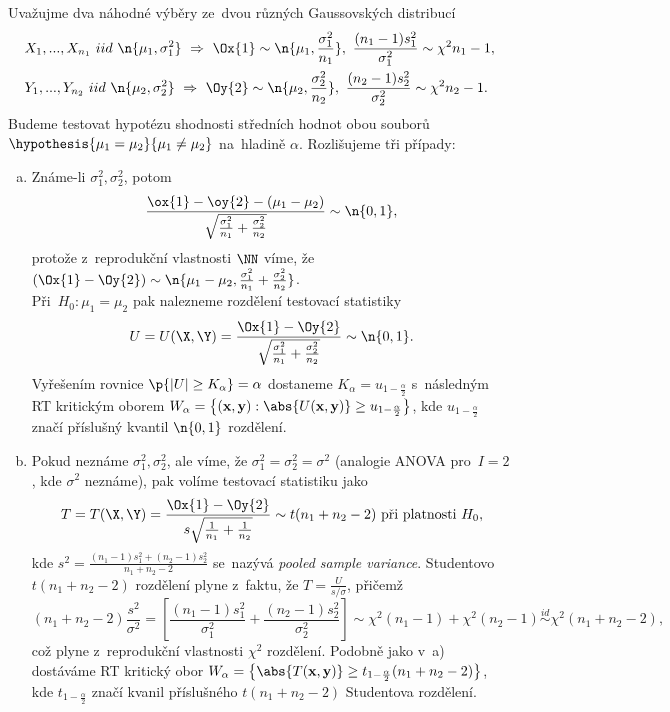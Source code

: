 \begin{example}\label{dvouvyber} Uvažujme dva náhodné výběry ze~dvou různých Gaussovských distribucí
\[
\begin{split}
&X_1,...,X_{n_1}~iid~\n{\mu_1,\sigma_1^2}~\Rightarrow~\Ox{1}\sim\n{\mu_1,\frac{\sigma_1^2}{n_1}},~\frac{(n_1-1)s_1^2}{\sigma_1^2}\sim\chi^2{n_1-1},\\
&Y_1,...,Y_{n_2}~iid~\n{\mu_2,\sigma_2^2}~\Rightarrow~\Oy{2}\sim\n{\mu_2,\frac{\sigma_2^2}{n_2}},~\frac{(n_2-1)s_2^2}{\sigma_2^2}\sim\chi^2{n_2-1}.
\end{split}
\]
Budeme testovat hypotézu shodnosti středních hodnot obou souborů $\hypothesis{\mu_1=\mu_2}{\mu_1\neq\mu_2}$ na~hladině $\alpha$. Rozlišujeme tři případy:
\begin{enumerate}[a)]
	\item Známe-li $\sigma_1^2,\sigma_2^2$, potom $$\frac{\ox{1}-\oy{2}-(\mu_1-\mu_2)}{\sqrt{\frac{\sigma_1^2}{n_1}+\frac{\sigma_2^2}{n_2}}}\sim\n{0,1},$$ protože z~reprodukční vlastnosti $\NN$ víme, že $(\Ox{1}-\Oy{2})\sim\n{\mu_1-\mu_2,\frac{\sigma_1^2}{n_1}+\frac{\sigma_2^2}{n_2}}$.\\ Při~$H_0:\mu_1=\mu_2$ pak nalezneme rozdělení testovací statistiky $$U=U(\X,\Y)=\frac{\Ox{1}-\Oy{2}}{\sqrt{\frac{\sigma_1^2}{n_1}+\frac{\sigma_2^2}{n_2}}}\sim\n{0,1}.$$ Vyřešením rovnice $\p{|U|\geq K_\alpha}=\alpha$ dostaneme $K_\alpha=u_{1-\frac{\alpha}{2}}$ s~následným RT kritickým oborem $W_\alpha=\left\{ (\textbf{x},\textbf{y}): \abs{U(\textbf{x},\textbf{y})}\geq u_{1-\frac{\alpha}{2}} \right\}$, kde $u_{1-\frac{\alpha}{2}}$ značí příslušný kvantil $\n{0,1}$ rozdělení. 
	\item Pokud neznáme $\sigma_1^2,\sigma_2^2$, ale víme, že $\sigma_1^2=\sigma_2^2=\sigma^2$ (analogie ANOVA pro~$I=2$, kde $\sigma^2$ neznáme), pak volíme testovací statistiku jako
	$$ T=T(\X,\Y)=\frac{\Ox{1}-\Oy{2}}{s\sqrt{\frac{1}{n_1}+\frac{1}{n_2}}}\sim t(n_1+n_2-2)\text{ při~platnosti }H_0, $$ kde $s^2=\frac{(n_1-1)s_1^2+(n_2-1)s_2^2}{n_1+n_2-2}$ se~nazývá \textit{pooled sample variance}.
	Studentovo $t(n_1+n_2-2)$ rozdělení plyne z~faktu, že $T=\frac{U}{s/\sigma}$, přičemž  $$(n_1+n_2-2)\frac{s^2}{\sigma^2}=\left[ \frac{(n_1-1)s_1^2}{\sigma_1^2}+\frac{(n_2-1)s_2^2}{\sigma_2^2} \right]\sim \chi^2(n_1-1)+\chi^2(n_2-1)\stackrel{id}{\sim}\chi^2(n_1+n_2-2),$$ což plyne z~reprodukční vlastnosti $\chi^2$ rozdělení. Podobně jako v~a) dostáváme RT kritický obor $ W_\alpha=\left\{ \abs{T(\textbf{x},\textbf{y})}\geq t_{1-\frac{\alpha}{2}}(n_1+n_2-2) \right\}$, kde $t_{1-\frac{\alpha}{2}}$ značí kvanil příslušného $t(n_1+n_2-2)$ Studentova rozdělení.

\end{enumerate}
\end{example}
